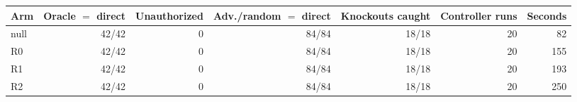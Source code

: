\begin{tabular}{lrrrrrr}
\toprule
Arm & Oracle $=$ direct & Unauthorized & Adv./random $=$ direct & Knockouts caught & Controller runs & Seconds \\
\midrule
null & 42/42 & 0 & 84/84 & 18/18 & 20 & 82 \\
R0 & 42/42 & 0 & 84/84 & 18/18 & 20 & 155 \\
R1 & 42/42 & 0 & 84/84 & 18/18 & 20 & 193 \\
R2 & 42/42 & 0 & 84/84 & 18/18 & 20 & 250 \\
\bottomrule
\end{tabular}
